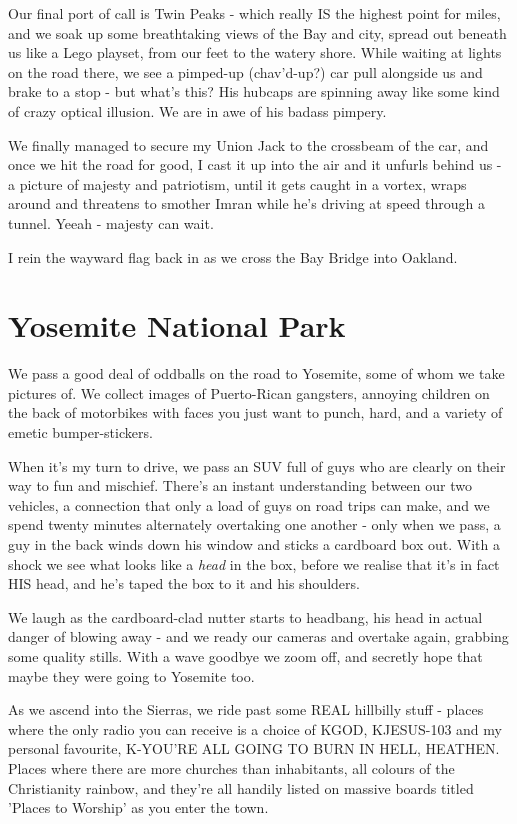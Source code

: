 \documentclass[b5paper,11pt,titlepage,draft]{book}
\begin{document}
Our final port of call is Twin Peaks - which really IS the highest point for miles, and we soak up some breathtaking views of the Bay and city, spread out beneath us like a Lego playset, from our feet to the watery shore.  While waiting at lights on the road there, we see a pimped-up (chav'd-up?) car pull alongside us and brake to a stop - but what's this?  His hubcaps are spinning away like some kind of crazy optical illusion.  We are in awe of his badass pimpery.

We finally managed to secure my Union Jack to the crossbeam of the car, and once we hit the road for good, I cast it up into the air and it unfurls behind us - a picture of majesty and patriotism, until it gets caught in a vortex, wraps around and threatens to smother Imran while he's driving at speed through a tunnel.  Yeeah - majesty can wait.

I rein the wayward flag back in as we cross the Bay Bridge into Oakland.

\section*{Yosemite National Park}
We pass a good deal of oddballs on the road to Yosemite, some of whom we take pictures of.  We collect images of Puerto-Rican gangsters, annoying children on the back of motorbikes with faces you just want to punch, hard, and a variety of emetic bumper-stickers.

When it's my turn to drive, we pass an SUV full of guys who are clearly on their way to fun and mischief.  There's an instant understanding between our two vehicles, a connection that only a load of guys on road trips can make, and we spend twenty minutes alternately overtaking one another - only when we pass, a guy in the back winds down his window and sticks a cardboard box out.  With a shock we see what looks like a \emph{head} in the box, before we realise that it's in fact HIS head, and he's taped the box to it and his shoulders.

We laugh as the cardboard-clad nutter starts to headbang, his head in actual danger of blowing away - and we ready our cameras and overtake again, grabbing some quality stills.  With a wave goodbye we zoom off, and secretly hope that maybe they were going to Yosemite too.

As we ascend into the Sierras, we ride past some REAL hillbilly stuff - places where the only radio you can receive is a choice of KGOD, KJESUS-103 and my personal favourite, K-YOU'RE ALL GOING TO BURN IN HELL, HEATHEN.  Places where there are more churches than inhabitants, all colours of the Christianity rainbow, and they're all handily listed on massive boards titled 'Places to Worship' as you enter the town.
\end{document}
